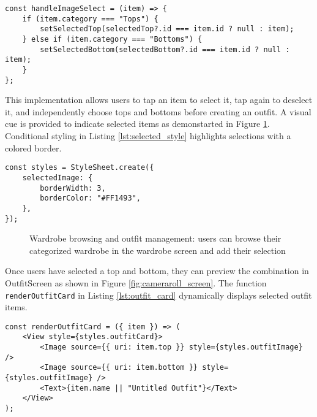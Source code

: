 \begin{lstlisting}[caption={Image selection handler}, label={lst:image_select}]
const handleImageSelect = (item) => {
    if (item.category === "Tops") {
        setSelectedTop(selectedTop?.id === item.id ? null : item);
    } else if (item.category === "Bottoms") {
        setSelectedBottom(selectedBottom?.id === item.id ? null : item);
    }
};
\end{lstlisting}

This implementation allows users to tap an item to select it, tap again to deselect it, and independently choose tops and bottoms before creating an outfit. A visual cue is provided to indicate selected items as demonstarted in Figure \ref{fig:selection_ visual_aid}. Conditional styling in Listing \ref{lst:selected_style} highlights selections with a colored border.

\begin{lstlisting}[caption={Conditional styling for selected items}, label={lst:selected_style}]
const styles = StyleSheet.create({
    selectedImage: {
        borderWidth: 3,
        borderColor: "#FF1493",
    },
});
\end{lstlisting}

\begin{figure}[!ht]
    \centering
    \qquad %
    \caption{Wardrobe browsing and outfit management: users can browse their categorized wardrobe in the wardrobe screen and add their selection}
    \label{fig:selection_ visual_aid}
\end{figure}

Once users have selected a top and bottom, they can preview the combination in OutfitScreen as shown in Figure \ref{fig:cameraroll_screen}. The function \texttt{renderOutfitCard} in Listing \ref{lst:outfit_card} dynamically displays selected outfit items.

\begin{lstlisting}[caption={Render outfit card in \texttt{OutfitScreen.js}}, label={lst:outfit_card}]
const renderOutfitCard = ({ item }) => (
    <View style={styles.outfitCard}>
        <Image source={{ uri: item.top }} style={styles.outfitImage} />
        <Image source={{ uri: item.bottom }} style={styles.outfitImage} />
        <Text>{item.name || "Untitled Outfit"}</Text>
    </View>
);
\end{lstlisting}

